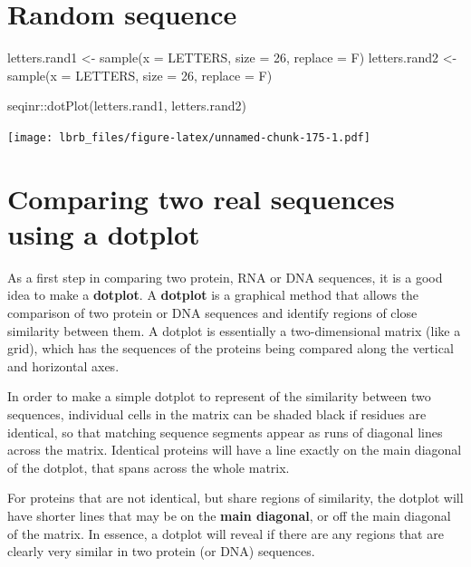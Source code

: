 \documentclass[
]{book}
\newenvironment{Shaded}{\begin{snugshade}}{\end{snugshade}}
\newcommand{\AttributeTok}[1]{\textcolor[rgb]{0.77,0.63,0.00}{#1}}
\newcommand{\DecValTok}[1]{\textcolor[rgb]{0.00,0.00,0.81}{#1}}
\newcommand{\FunctionTok}[1]{\textcolor[rgb]{0.00,0.00,0.00}{#1}}
\newcommand{\NormalTok}[1]{#1}
\newcommand{\OtherTok}[1]{\textcolor[rgb]{0.56,0.35,0.01}{#1}}
\newcommand{\SpecialCharTok}[1]{\textcolor[rgb]{0.00,0.00,0.00}{#1}}
\begin{document}
\hypertarget{random-sequence}{%
\section{Random sequence}\label{random-sequence}}

\begin{Shaded}
\begin{Highlighting}[]
\NormalTok{letters.rand1 }\OtherTok{\textless{}{-}} \FunctionTok{sample}\NormalTok{(}\AttributeTok{x =}\NormalTok{ LETTERS, }\AttributeTok{size =} \DecValTok{26}\NormalTok{, }\AttributeTok{replace =}\NormalTok{ F)}
\NormalTok{letters.rand2 }\OtherTok{\textless{}{-}} \FunctionTok{sample}\NormalTok{(}\AttributeTok{x =}\NormalTok{ LETTERS, }\AttributeTok{size =} \DecValTok{26}\NormalTok{, }\AttributeTok{replace =}\NormalTok{ F)}


\NormalTok{seqinr}\SpecialCharTok{::}\FunctionTok{dotPlot}\NormalTok{(letters.rand1, }
\NormalTok{                letters.rand2)}
\end{Highlighting}
\end{Shaded}

\texttt{[image: lbrb\_files/figure-latex/unnamed-chunk-175-1.pdf]}

\hypertarget{comparing-two-real-sequences-using-a-dotplot}{%
\section{Comparing two real sequences using a dotplot}\label{comparing-two-real-sequences-using-a-dotplot}}

As a first step in comparing two protein, RNA or DNA sequences, it is a good idea to make a \textbf{dotplot}. A \textbf{dotplot} is a graphical method that allows the comparison of two protein or DNA sequences and identify regions of close similarity between them. A dotplot is essentially a two-dimensional matrix (like a grid), which has the sequences of the proteins being compared along the vertical and horizontal axes.

In order to make a simple dotplot to represent of the similarity between two sequences, individual cells in the matrix can be shaded black if residues are identical, so that matching sequence segments appear as runs of diagonal lines across the matrix. Identical proteins will have a line exactly on the main diagonal of the dotplot, that spans across the whole matrix.

For proteins that are not identical, but share regions of similarity, the dotplot will have shorter lines that may be on the \textbf{main diagonal}, or off the main diagonal of the matrix. In essence, a dotplot will reveal if there are any regions that are clearly very similar in two protein (or DNA) sequences.
\end{document}
